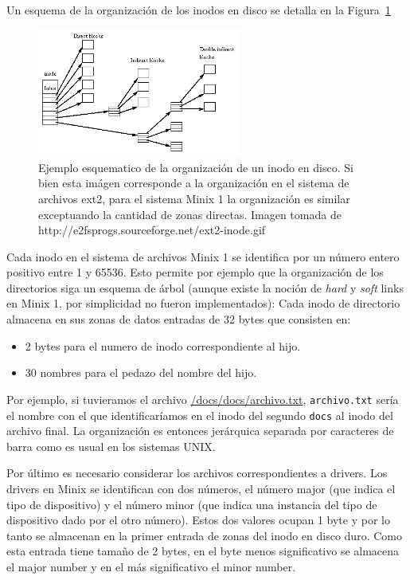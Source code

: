 Un esquema de la organizaci\'on de los inodos en disco se detalla en la Figura~\ref{fig::inodes}

\begin{figure}[H]
	\caption{Ejemplo esquematico de la organizaci\'on de un inodo en disco. Si bien esta im\'agen corresponde
	a la organizaci\'on en el sistema de archivos ext2, para el sistema Minix 1 la organizaci\'on es similar exceptuando
	la cantidad de zonas directas. Imagen tomada de http://e2fsprogs.sourceforge.net/ext2-inode.gif }
	\label{fig::inodes}
	\centering
	\includegraphics[width=0.6\textwidth]{inodes.png}
\end{figure} 

Cada inodo en el sistema de archivos Minix 1 se identifica por un n\'umero entero positivo entre 1 y 65536. Esto permite por
ejemplo que la organizaci\'on de los directorios siga un esquema de \'arbol (aunque existe la noci\'on de \textit{hard} y \textit{soft}
links en Minix 1, por simplicidad no fueron implementados): Cada inodo de directorio almacena en sus zonas de datos entradas de 32 bytes
que consisten en:

\begin{itemize}
	\item 2 bytes para el numero de inodo correspondiente al hijo.
	\item 30 nombres para el pedazo del nombre del hijo.
\end{itemize}

Por ejemplo, si tuvieramos el archivo \url{/docs/docs/archivo.txt}, \texttt{archivo.txt} ser\'ia el nombre con el que identificar\'iamos en
el inodo del segundo \texttt{docs} al inodo del archivo final. La organizaci\'on es entonces jer\'arquica separada por caracteres de barra
como es usual en los sistemas UNIX.

Por \'ultimo es necesario considerar los archivos correspondientes a drivers. Los drivers en Minix se identifican con dos n\'umeros, el
n\'umero major (que indica el tipo de dispositivo) y el n\'umero minor (que indica una instancia del tipo de dispositivo dado por el otro
n\'umero). Estos dos valores ocupan 1 byte y por lo tanto se almacenan en la primer entrada de zonas del inodo en disco duro. Como esta
entrada tiene tama\~no de 2 bytes, en el byte menos significativo se almacena el major number y en el m\'as significativo el minor number.
 
